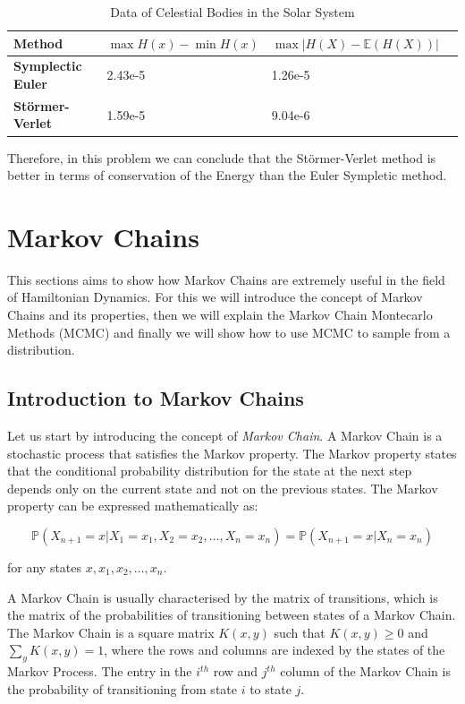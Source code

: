 \documentclass{article}
\begin{document}
\begin{table}[H]
	\centering
	\renewcommand{\arraystretch}{1.2} %
	\begin{tabular}{>{\bfseries}l >{\raggedleft}p{4cm} >{\raggedleft\arraybackslash}p{4cm} >{\raggedleft\arraybackslash}p{3cm}}
	\toprule
	\textbf{Method} & $\max{H(x)} - \min{H(x)}$  & $\max{|H(X) - \mathbb{E}(H(X))|}$\\
	\midrule
	Symplectic Euler & 2.43e-5 & 1.26e-5  \\
	Störmer-Verlet   & 1.59e-5 & 9.04e-6 \\
	\bottomrule
	\end{tabular}
	\caption{Data of Celestial Bodies in the Solar System}
	\label{table:comparison}
\end{table}

Therefore, in this problem we can conclude that the Störmer-Verlet method is better in terms of conservation of the Energy than the Euler Sympletic method.

\section{Markov Chains}
\label{sec:markov_chains}

This sections aims to show how Markov Chains are extremely useful in the field of Hamiltonian Dynamics. For this we will introduce the concept of Markov Chains and its properties, then we will explain the Markov Chain Montecarlo Methods (MCMC) and finally we will show how to use MCMC to sample from a distribution.

\subsection{Introduction to Markov Chains}
\label{sec:introduction_markov_chains}

Let us start by introducing the concept of \textit{Markov Chain}. A Markov Chain is a stochastic process that satisfies the Markov property. The Markov property states that the conditional probability distribution for the state at the next step depends only on the current state and not on the previous states. The Markov property can be expressed mathematically as:

\[
	\mathbb{P}(X_{n+1} = x | X_1 = x_1, X_2 = x_2, \dots, X_n = x_n) = \mathbb{P}(X_{n+1} = x | X_n = x_n)
\]

for any states \(x, x_1, x_2, \dots, x_n\). 

A Markov Chain is usually characterised by the matrix of transitions, which is the matrix of the probabilities of transitioning between states of a Markov Chain. The Markov Chain is a square matrix $K(x,y)$ such that $K(x,y) \geq 0$ and \(\sum_{y} K(x,y) = 1\), where the rows and columns are indexed by the states of the Markov Process. The entry in the \(i^{th}\) row and \(j^{th}\) column of the Markov Chain is the probability of transitioning from state \(i\) to state \(j\).
\end{document}
